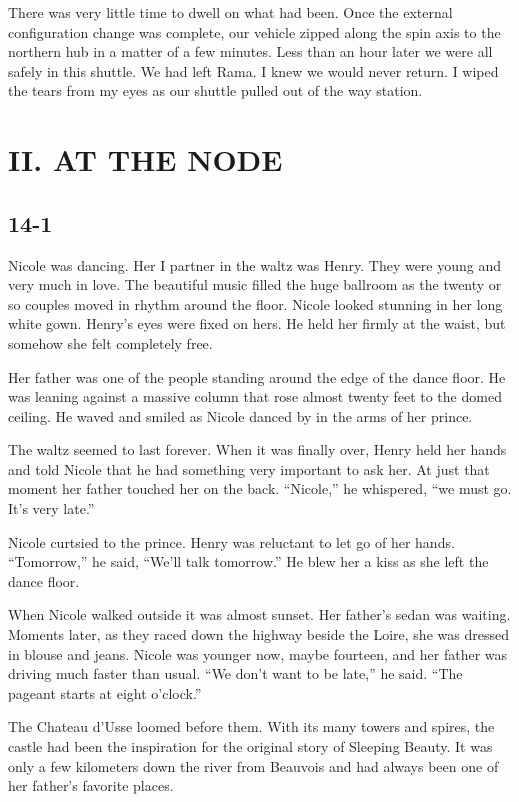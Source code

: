 \documentclass[]{article}
\begin{document}
{There was very little time to dwell on what had been. Once the external configuration change was complete, our vehicle zipped along the spin axis to the northern hub in a matter of a few minutes. Less than an hour later we were all safely in this shuttle. We had left Rama. I knew we would never return. I wiped the tears from my eyes as our shuttle pulled out of the way station.


\section{II. AT THE NODE}



\subsection{14-1}

Nicole was dancing. Her I partner in the waltz was Henry. They were young and very much in love. The beautiful music filled the huge ballroom as the twenty or so couples moved in rhythm around the floor. Nicole looked stunning in her long white gown. Henry’s eyes were fixed on hers. He held her firmly at the waist, but somehow she felt completely free.

Her father was one of the people standing around the edge of the dance floor. He was leaning against a massive column that rose almost twenty feet to the domed ceiling. He waved and smiled as Nicole danced by in the arms of her prince.

The waltz seemed to last forever. When it was finally over, Henry held her hands and told Nicole that he had something very important to ask her. At just that moment her father touched her on the back. “Nicole,” he whispered, “we must go. It’s very late.”

Nicole curtsied to the prince. Henry was reluctant to let go of her hands. “Tomorrow,” he said, “We’ll talk tomorrow.” He blew her a kiss as she left the dance floor.

When Nicole walked outside it was almost sunset. Her father’s sedan was waiting. Moments later, as they raced down the highway beside the Loire, she was dressed in blouse and jeans. Nicole was younger now, maybe fourteen, and her father was driving much faster than usual. “We don’t want to be late,” he said. “The pageant starts at eight o’clock.”

The Chateau d’Usse loomed before them. With its many towers and spires, the castle had been the inspiration for the original story of Sleeping Beauty. It was only a few kilometers down the river from Beauvois and had always been one of her father’s favorite places.

}
\end{document}
